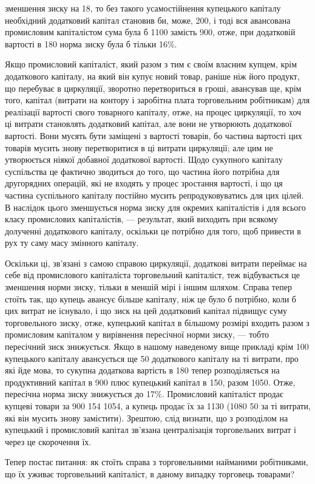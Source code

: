 \parcont{}  %
зменшення зиску на 18, то без такого усамостійнення купецького
капіталу необхідний додатковий капітал становив би, може, 200,
і тоді вся авансована промисловим капіталістом сума була б 1100
замість 900, отже, при додатковій вартості в 180 норма зиску
була б тільки 16\%.

Якщо промисловий капіталіст, який разом з тим є своїм
власним купцем, крім додаткового капіталу, на який він купує
новий товар, раніше ніж його продукт, що перебуває в циркуляції,
зворотно перетвориться в гроші, авансував ще, крім того,
капітал (витрати на контору і заробітна плата торговельним
робітникам) для реалізації вартості свого товарного капіталу,
отже, на процес циркуляції, то хоч ці витрати становлять
додатковий капітал, але вони не утворюють додаткової вартості.
Вони мусять бути заміщені з вартості товарів, бо частина
вартості цих товарів мусить знову перетворитися в ці витрати
циркуляції; але цим не утворюється ніякої добавної додаткової
вартості. Щодо сукупного капіталу суспільства це фактично
зводиться до того, що частина його потрібна для другорядних
операцій, які не входять у процес зростання вартості, і що ця
частина суспільного капіталу постійно мусить репродуковуватись
для цих цілей. В наслідок цього зменшується норма зиску
для окремих капіталістів і для всього класу промислових капіталістів,
— результат, який виходить при всякому долученні
додаткового капіталу, оскільки це потрібно для того, щоб привести
в рух ту саму масу змінного капіталу.

Оскільки ці, зв’язані з самою справою циркуляції, додаткові
витрати переймає на себе від промислового капіталіста торговельний
капіталіст, теж відбувається це зменшення норми зиску,
тільки в меншій мірі і іншим шляхом. Справа тепер стоїть так,
що купець авансує більше капіталу, ніж це було б потрібно,
коли б цих витрат не існувало, і що зиск на цей додатковий
капітал підвищує суму торговельного зиску, отже, купецький
капітал в більшому розмірі входить разом з промисловим капіталом
у вирівнення пересічної норми зиску, — тобто пересічний
зиск знижується. Якщо в нашому наведеному вище прикладі крім
100 купецького капіталу авансується ще 50 додаткового капіталу
на ті витрати, про які йде мова, то сукупна додаткова
вартість в 180 тепер розподіляється на продуктивний капітал
в 900 плюс купецький капітал в 150, разом \deq{} 1050. Отже, пересічна
норма зиску знижується до 17\%. Промисловий капіталіст
продає купцеві товари за 900 \dplus{} 154 \deq{} 1054, а купець
продає їх за 1130 (1080 \dplus{} 50 за ті витрати, які він мусить знову
замістити). Зрештою, слід визнати, що з розподілом на купецький
і промисловий капітал зв’язана централізація торговельних
витрат і через це скорочення їх.

Тепер постає питання: як стоїть справа з торговельними
найманими робітниками, що їх уживає торговельний капіталіст,
в даному випадку торговець товарами?

